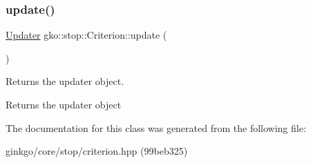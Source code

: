 \subsubsection{\texorpdfstring{update()}{update()}}
{\footnotesize\ttfamily \hyperlink{classgko_1_1stop_1_1Criterion_1_1Updater}{Updater} gko\+::stop\+::\+Criterion\+::update (\begin{DoxyParamCaption}{ }\end{DoxyParamCaption})}



Returns the updater object. 

\begin{DoxyReturn}{Returns}
the updater object 
\end{DoxyReturn}


The documentation for this class was generated from the following file\+:\begin{DoxyCompactItemize}
\item 
ginkgo/core/stop/criterion.\+hpp (99beb325)\end{DoxyCompactItemize}
